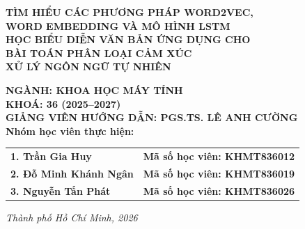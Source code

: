 \documentclass[12pt,a4paper]{article}
\begin{document}
\begin{titlepage}
\begin{center}
        \vspace{1.3cm}

        {\Large\bfseries TÌM HIỂU CÁC PHƯƠNG PHÁP WORD2VEC,}\\[0.25cm]
        {\Large\bfseries WORD EMBEDDING VÀ MÔ HÌNH LSTM}\\[0.25cm]
        {\Large\bfseries HỌC BIỂU DIỄN VĂN BẢN ỨNG DỤNG CHO}\\[0.25cm]
        {\Large\bfseries BÀI TOÁN PHÂN LOẠI CẢM XÚC}\\[1.2cm]

        {\large\bfseries XỬ LÝ NGÔN NGỮ TỰ NHIÊN}\\[1.4cm]

        \begin{singlespace}
            {\normalsize\bfseries NGÀNH: KHOA HỌC MÁY TÍNH}\\[0.25cm]
            {\normalsize\bfseries KHOÁ: 36 (2025--2027)}\\[0.25cm]
            {\normalsize\bfseries GIẢNG VIÊN HƯỚNG DẪN: PGS.TS. LÊ ANH CƯỜNG}\\[0.8cm]
            
            \textbf{Nhóm học viên thực hiện:}\\[0.35cm]
            \begin{tabular}{ll}
                \textbf{1. Trần Gia Huy} & \textbf{Mã số học viên: KHMT836012} \\
                \textbf{2. Đỗ Minh Khánh Ngân} & \textbf{Mã số học viên: KHMT836019} \\
                \textbf{3. Nguyễn Tấn Phát} & \textbf{Mã số học viên: KHMT836026} \\
            \end{tabular}
        \end{singlespace}

        \vfill
        {\large\itshape Thành phố Hồ Chí Minh, 2026}
    \end{center}
\end{titlepage}
\end{document}
